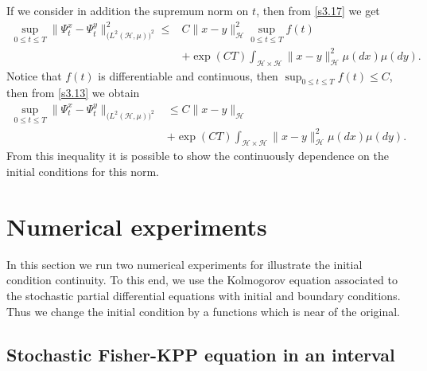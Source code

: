 \documentclass[review, onefignum, onetabnum]{siamart171218}
\begin{document}
\begin{remark}
    If we consider in addition the supremum norm on $t$, then from 
    \eqref{s3.17} we get
    \begin{equation}
        \label{s3.13}
        \begin{aligned}
            \sup_{0\le t\le T}\| \Psi_t^x-\Psi_t^y\|_{
                \big(L^2(\mathcal{H},\mu) \big)^2} ^ 2 
                \le&
                 C \| x-y\|_{\mathcal{H}}^2  
                 \sup_{0\le t\le T} f(t)
                 \\
                 &+
                \exp(CT)
                \int_{\mathcal{H}\times \mathcal{H}} 
                \|x-y\|_{\mathcal{H}}^2 \mu(dx)\mu(dy).
        \end{aligned} 
    \end{equation}
    Notice that $f(t)$ is differentiable and continuous, then 
    $\sup_{0\le t\le T} f(t)\le C$, then from \eqref{s3.13} we obtain
    \begin{equation}
        \label{s3.14}
        \begin{aligned}
            \sup_{0\le t\le T}
            \| 
                \Psi_t^x-\Psi_t^y
            \|_{\big(L^2(\mathcal{H},\mu)\big)^2} 
            &\le 
            C \| x-y\|_{\mathcal{H}} 
            \\
            & + 
            \exp(CT)
            \int_{\mathcal{H}\times \mathcal{H}} 
            \| x-y\|_{\mathcal{H}}^2 \mu(dx)\mu(dy).
        \end{aligned}
    \end{equation}
    From this inequality it is possible to show the continuously dependence on 
    the initial conditions for this norm.
\end{remark}


\section{Numerical experiments}
        In this section we run two numerical experiments for illustrate
    the initial condition continuity. To this end, we use the Kolmogorov 
    equation associated to the 
    stochastic partial differential equations with initial and boundary
    conditions. Thus we change the initial condition  by a functions which
    is near of the original.
    
    \subsection*{Stochastic Fisher-KPP equation in an interval}
        
        
\end{document}
